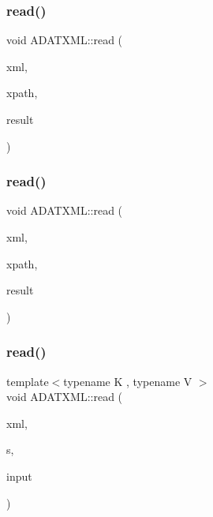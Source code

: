 \mbox{\label{group__io_ga2fb042288bd86fb85377268d95b5e39f}} 
\subsubsection{\texorpdfstring{read()}{read()}\hspace{0.1cm}{\footnotesize\ttfamily [49/52]}}
{\footnotesize\ttfamily void A\+D\+A\+T\+X\+M\+L\+::read (\begin{DoxyParamCaption}\item[{\mbox{\hyperlink{classADATXML_1_1XMLReader}{X\+M\+L\+Reader}} \&}]{xml,  }\item[{const std\+::string \&}]{xpath,  }\item[{\mbox{\hyperlink{classADAT_1_1Array1dO}{A\+D\+A\+T\+::\+Array1dO}}$<$ float $>$ \&}]{result }\end{DoxyParamCaption})}

\mbox{\label{group__io_ga6356b58aa7c58aa4bb8eaed5db9f8f40}} 
\subsubsection{\texorpdfstring{read()}{read()}\hspace{0.1cm}{\footnotesize\ttfamily [50/52]}}
{\footnotesize\ttfamily void A\+D\+A\+T\+X\+M\+L\+::read (\begin{DoxyParamCaption}\item[{\mbox{\hyperlink{classADATXML_1_1XMLReader}{X\+M\+L\+Reader}} \&}]{xml,  }\item[{const std\+::string \&}]{xpath,  }\item[{\mbox{\hyperlink{classADAT_1_1Array1dO}{A\+D\+A\+T\+::\+Array1dO}}$<$ double $>$ \&}]{result }\end{DoxyParamCaption})}

\mbox{\label{group__io_ga01c7047fcb175e3518660cdab70536c9}} 
\subsubsection{\texorpdfstring{read()}{read()}\hspace{0.1cm}{\footnotesize\ttfamily [51/52]}}
{\footnotesize\ttfamily template$<$typename K , typename V $>$ \\
void A\+D\+A\+T\+X\+M\+L\+::read (\begin{DoxyParamCaption}\item[{\mbox{\hyperlink{classADATXML_1_1XMLReader}{X\+M\+L\+Reader}} \&}]{xml,  }\item[{const std\+::string \&}]{s,  }\item[{std\+::map$<$ K, V $>$ \&}]{input }\end{DoxyParamCaption})\hspace{0.3cm}{\ttfamily [inline]}}



